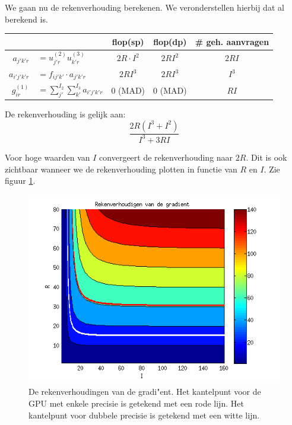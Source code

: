 We gaan nu de rekenverhouding berekenen. We veronderstellen hierbij dat \FF{} al berekend is.

\begin{tabular}{|r l|c| c|c|}
\hline
					&			& flop(sp)			& flop(dp) 			& \# geh. aanvragen	\\
\hline
$a_{j'k'r}$	&$= u^{(2)}_{j'r} u^{(3)}_{k'r}$%
								& $2 R \cdot I^2$	& $2 R I^2$			&	$2 R I$			\\
$a_{i'j'k'r}$	&$= f_{ij'k'} \cdot a_{j'k'r}$%
								& $2 R I^3$			& $2 R I^3$			&	$I^3$			\\
$g^{(1)}_{ir}$	&$= \sum_{j'}^{I_2}\sum_{k'}^{I_3}a_{i'j'k'r}$%
								& 0 (MAD)			& 0 (MAD)			&	$R I$			\\
\hline
\end{tabular}

De rekenverhouding is gelijk aan:
\[
	\frac{2R(I^3 + I^2)}{I^3 + 3RI}
\]

Voor hoge waarden van $I$ convergeert de rekenverhouding naar $2R$. Dit is ook zichtbaar wanneer we de rekenverhouding plotten in functie van $R$ en $I$. Zie figuur \ref{haalG}.

\begin{figure}
\centering
\includegraphics{haalG}
\caption{\label{haalG}De rekenverhoudingen van de gradi"ent. Het kantelpunt voor de GPU met enkele precisie is getekend met een rode lijn. Het kantelpunt voor dubbele precisie is getekend met een witte lijn.}
\end{figure}

